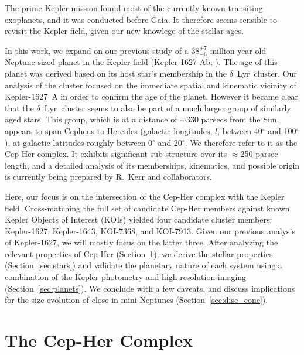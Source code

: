 \documentclass[12pt,twocolumn,linenumbers]{aastex63}
\begin{document}
The prime Kepler mission \citep{borucki_kepler_2010} found most of the
currently known transiting exoplanets, and it was conducted before
Gaia.  It therefore seems sensible to revisit the Kepler field, given
our new knowlege of the stellar ages.

In this work, we expand on our previous study of a $38^{+7}_{-6}$
million year old Neptune-sized planet in the Kepler field (Kepler-1627
Ab; \citealt{bouma_kep1627_2022}).  The age of this planet was derived
based on its host star's membership in the $\delta$\ Lyr\ cluster.
Our analysis of the cluster focused on the immediate spatial and
kinematic vicinity of Kepler-1627~A in order to confirm the age of the
planet.  However it became clear that the $\delta$\ Lyr\ cluster seems
to also be part of a much larger group of similarly aged stars.  This
group, which is at a distance of $\sim$330 parsecs from the Sun,
appears to span Cepheus to Hercules (galactic longitudes, $l$, between
40$^\circ$ and 100$^\circ$), at galactic latitudes roughly between
0$^\circ$ and 20$^\circ$.  We therefore refer to it as the Cep-Her
complex.  It exhibits significant sub-structure over its $\approx$250
parsec length, and a detailed analysis of its memberships, kinematics,
and possible origin is currently being prepared by R.~Kerr and
collaborators.

Here, our focus is on the intersection of the Cep-Her complex with the
Kepler field.  Cross-matching the full set of candidate Cep-Her
members against known Kepler Objects of Interest (KOIs)
\citep{thompson_planetary_2018} yielded four candidate cluster
members: Kepler-1627, Kepler-1643, KOI-7368, and KOI-7913.  Given our
previous analysis of Kepler-1627, we will mostly focus on the latter
three.  After analyzing the relevant properties of Cep-Her
(Section~\ref{sec:cluster}), we derive the stellar properties
(Section~\ref{sec:stars}) and validate the planetary nature of each
system using a combination of the Kepler photometry and
high-resolution imaging (Section~\ref{sec:planets}).  
We conclude with a few caveats, 
and discuss implications for the size-evolution of close-in
mini-Neptunes (Section~\ref{sec:disc_conc}).

\section{The Cep-Her Complex}
\label{sec:cluster}
\end{document}
